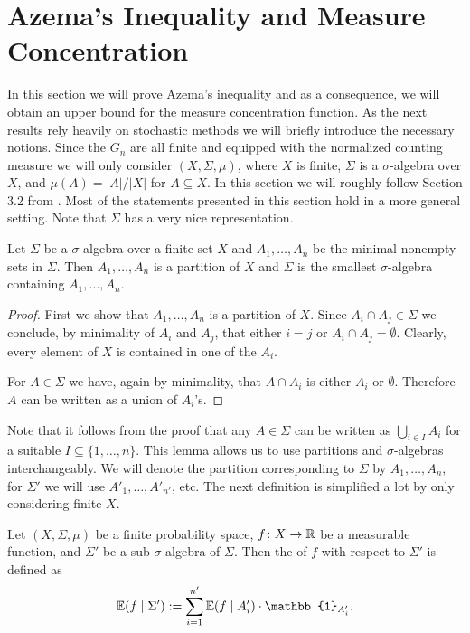 \section{Azema's Inequality and Measure Concentration}\label{sec:azema}
In this section we will prove Azema's inequality and as a consequence, we will obtain an upper bound for the measure concentration function. As the next results rely heavily on stochastic methods we will briefly introduce the necessary notions. Since the $G_n$ are all finite and equipped with the normalized counting measure we will only consider  $(X,\Sigma,\mu)$, where $X$ is finite, $\Sigma$ is a $\sigma$-algebra over $X$, and $\mu(A)=|A|/|X|$ for $A\subseteq X$. In this section we will roughly follow Section 3.2 from \cite{Azema}. Most of the statements presented in this section hold in a more general setting. Note that $\Sigma$ has a very nice representation.%

\begin{lemma}
Let $\Sigma$ be a $\sigma$-algebra over a finite set $X$ and $A_1,\dots,A_n$ be the minimal nonempty sets in $\Sigma$. Then $A_1,\dots,A_n$ is a partition of $X$ and $\Sigma$ is the smallest $\sigma$-algebra containing $A_1,\dots,A_n$.
\end{lemma}
\begin{proof}
First we show that $A_1,\dots,A_n$ is a  partition of $X$. Since $A_i\cap A_j\in\Sigma$ we conclude, by minimality of $A_i$ and $A_j$, that either $i=j$ or $A_i\cap A_j=\emptyset$. Clearly, every element of $X$ is contained in one of the $A_i$. 

For $A\in\Sigma$ we have, again by minimality, that $A\cap A_i$ is either $A_i$ or $\emptyset$. Therefore $A$ can be written as a union of $A_i$'s.
\end{proof}
Note that it follows from the proof that any $A\in\Sigma$ can be written as $\bigcup_{i\in I}A_i$ for a suitable $I\subseteq\{1,\dots,n\}$. This lemma allows us to use partitions and $\sigma$-algebras interchangeably. We will denote the partition corresponding to $\Sigma$ by $A_1,\dots,A_n$, for $\Sigma'$ we will use $A'_1,\dots,A'_{n'}$, etc. The next definition is simplified a lot by only considering finite $X$.

\begin{definition}
Let $(X,\Sigma,\mu)$ be a finite probability space, $f\colon X\to \mathbb{R}$ be a measurable function, and $\Sigma'$ be a sub-$\sigma$-algebra of $\Sigma$. Then the  of $f$ with respect to $\Sigma'$ is defined as
\[\E(f\mid \Sigma'):=\sum_{i=1}^{n'}\E(f\mid A'_i)\cdot \mathbb{1}_{A'_i}.\]
\end{definition}

